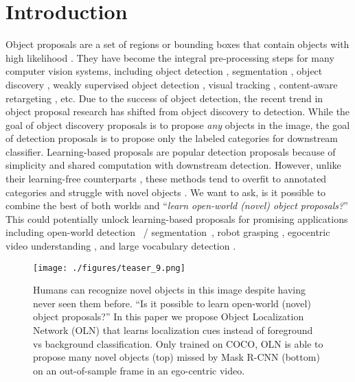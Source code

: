 \documentclass[10pt,twocolumn,letterpaper]{article}
\newcommand{\OURS}{OLN}
\begin{document}
\section{Introduction}
Object proposals are a set of regions or bounding boxes that contain objects with high likelihood \cite{kuo2015deepbox,pinheiro2015learning,pont2016multiscale,fasterNIPS2015,uijlings2013selective, vu2019cascade, wang2019region, zitnick2014edge}. They have become the integral pre-processing steps for many computer vision systems, including object detection \cite{kuo2015deepbox,pinheiro2015learning,pont2016multiscale,fasterNIPS2015,uijlings2013selective, zitnick2014edge}, segmentation \cite{arbelaez2012semantic,carreira2012semantic,dai2015convolutional}, object discovery \cite{deselaers2012weakly,cho2015unsupervised,rubinstein2013unsupervised}, weakly supervised object detection \cite{arun2019dissimilarity,gao2019c,tang2018pcl}, visual tracking \cite{kwak2015unsupervised,wang2015transferring}, content-aware retargeting \cite{sun2011scale}, etc. Due to the success of object detection, the recent trend in object proposal research has shifted from object discovery to detection. While the goal of object discovery proposals is to propose \textit{any} objects in the image, the goal of detection proposals is to propose only the labeled categories for downstream classifier. Learning-based proposals are popular detection proposals because of simplicity and shared computation with downstream detection. However, unlike their learning-free counterparts \cite{pont2016multiscale,uijlings2013selective,zitnick2014edge}, these methods tend to overfit to annotated categories and struggle with novel objects \cite{kuo2015deepbox,pinheiro2015learning,wang2020leads}. We want to ask, is it possible to combine the best of both worlds and ``\textit{learn open-world (novel) object proposals?}'' This could potentially unlock learning-based proposals for promising applications including open-world detection~\cite{joseph2021towards} / segmentation~\cite{wang2021unidentified}, robot grasping \cite{dasari2019robonet}, egocentric video understanding \cite{Damen2020Collection}, and large vocabulary detection \cite{gupta2019lvis}. 



\begin{figure}
\texttt{[image: ./figures/teaser\_9.png]}
\caption{\small{Humans can recognize novel objects in this image despite having never seen them before. ``Is it possible to learn open-world (novel) object proposals?'' In this paper we propose Object Localization Network (OLN) that learns localization cues instead of foreground vs background classification. Only trained on COCO\cite{lin2014microsoft}, \OURS{} is able to propose many novel objects (top) missed by Mask R-CNN (bottom) on an out-of-sample frame in an ego-centric video.
}}
\label{fig:teaser}
\end{figure}
\end{document}
